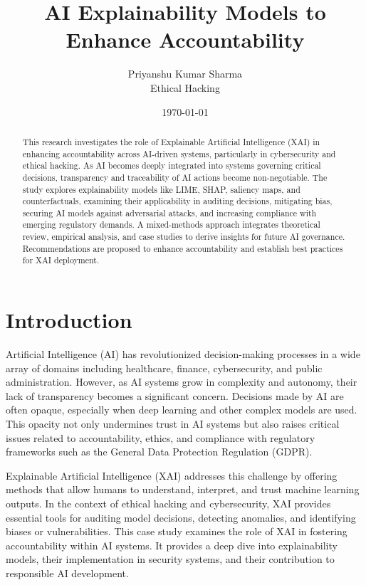\documentclass[12pt]{article}
\title{AI Explainability Models to Enhance Accountability}
\author{Priyanshu Kumar Sharma \\ Ethical Hacking}
\date{\today}
\begin{document}
\maketitle

\begin{abstract}
This research investigates the role of Explainable Artificial Intelligence (XAI) in enhancing accountability across AI-driven systems, particularly in cybersecurity and ethical hacking. As AI becomes deeply integrated into systems governing critical decisions, transparency and traceability of AI actions become non-negotiable. The study explores explainability models like LIME, SHAP, saliency maps, and counterfactuals, examining their applicability in auditing decisions, mitigating bias, securing AI models against adversarial attacks, and increasing compliance with emerging regulatory demands. A mixed-methods approach integrates theoretical review, empirical analysis, and case studies to derive insights for future AI governance. Recommendations are proposed to enhance accountability and establish best practices for XAI deployment.
\end{abstract}

\section{Introduction}
Artificial Intelligence (AI) has revolutionized decision-making processes in a wide array of domains including healthcare, finance, cybersecurity, and public administration. However, as AI systems grow in complexity and autonomy, their lack of transparency becomes a significant concern. Decisions made by AI are often opaque, especially when deep learning and other complex models are used. This opacity not only undermines trust in AI systems but also raises critical issues related to accountability, ethics, and compliance with regulatory frameworks such as the General Data Protection Regulation (GDPR).

Explainable Artificial Intelligence (XAI) addresses this challenge by offering methods that allow humans to understand, interpret, and trust machine learning outputs. In the context of ethical hacking and cybersecurity, XAI provides essential tools for auditing model decisions, detecting anomalies, and identifying biases or vulnerabilities. This case study examines the role of XAI in fostering accountability within AI systems. It provides a deep dive into explainability models, their implementation in security systems, and their contribution to responsible AI development.
\end{document}
